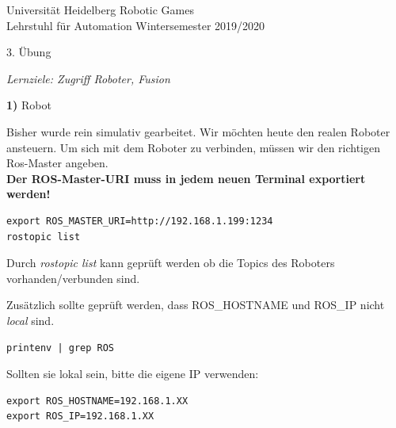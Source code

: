 \documentclass[a4paper,10pt]{article}
\newcommand{\uebungsnummer}{3}
\begin{document}
\large

{\textsc Universität Heidelberg}
{\hfill Robotic Games}\\
{\small Lehrstuhl für Automation}
{\hfill \small Wintersemester 2019/2020}%


\begin{center}
{\Large \uebungsnummer. Übung 
\textsc{}}\\
\end{center}


\begin{center}
\small \it Lernziele: Zugriff Roboter, Fusion
\end{center}

\bigskip
\bigskip


\Large \textbf{1)} Robot \hfill \\ \normalsize



Bisher wurde rein simulativ gearbeitet.
Wir möchten heute den realen Roboter ansteuern.
Um sich mit dem Roboter zu verbinden, müssen wir den richtigen Ros-Master angeben. \\
\textbf{Der ROS-Master-URI muss in jedem neuen Terminal exportiert werden!}
\begin{lstlisting}[language=xml, basicstyle=\small]
export ROS_MASTER_URI=http://192.168.1.199:1234
rostopic list
\end{lstlisting}
Durch \textit{rostopic list} kann geprüft werden ob die Topics des Roboters vorhanden/verbunden sind.

\bigskip
Zusätzlich sollte geprüft werden, dass ROS\_HOSTNAME und ROS\_IP nicht \textit{local} sind.
\begin{lstlisting}[language=xml, basicstyle=\small]
printenv | grep ROS
\end{lstlisting}

\bigskip
Sollten sie lokal sein, bitte die eigene IP verwenden:
\begin{lstlisting}[language=xml, basicstyle=\small]
export ROS_HOSTNAME=192.168.1.XX
export ROS_IP=192.168.1.XX
\end{lstlisting}
\end{document}
